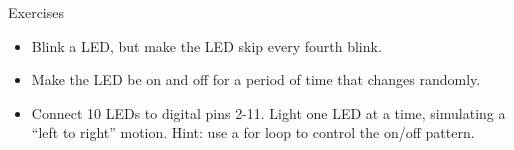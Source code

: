 \documentclass[aspectratio=1610]{beamer}
\begin{document}

\begin{frame}[plain,t]{Exercises}

\begin{itemize}
\item Blink a LED, but make the LED skip every fourth blink.
\item Make the LED be on and off for a period of time
  that changes randomly.
\item Connect 10 LEDs to digital pins 2-11. Light one LED at a time,
  simulating a ``left to right'' motion. Hint: use a for loop to
  control the on/off pattern. 
\end{itemize}
\end{frame}
\end{document}
